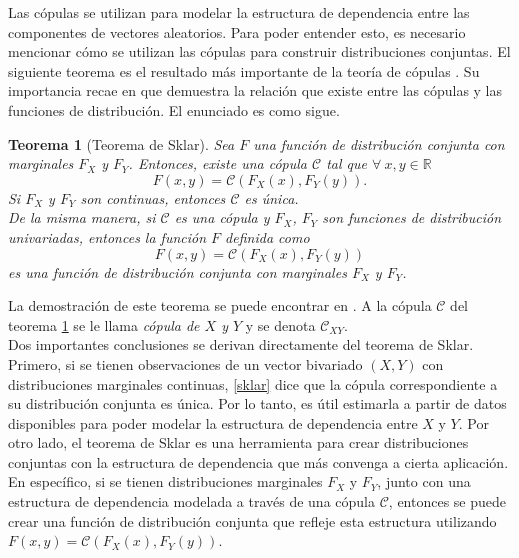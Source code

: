 \documentclass[11pt,a4paper]{article}
\newcommand{\R}{\mathbb{R}}
\newtheorem{theorem}{Teorema}[section]
\begin{document}
Las cópulas se utilizan para modelar la estructura de dependencia entre las componentes de vectores aleatorios. Para poder entender esto, es necesario mencionar cómo se utilizan las cópulas para construir distribuciones conjuntas. El siguiente teorema es el resultado más importante de la teoría de cópulas \citep{copula_modeling}. Su importancia recae en que demuestra la relación que existe entre las cópulas y las funciones de distribución. El enunciado es como sigue.\\

\begin{theorem}[Teorema de Sklar]
\label{sklar}
Sea $F$ una función de distribución conjunta con marginales $F_X$ y $F_Y$. Entonces, existe una cópula $\mathcal{C}$ tal que $\forall \ x,y \in \R$ $$F(x,y) = \mathcal{C}(F_X(x), F_Y(y)).$$ Si $F_X$ y $F_Y$ son continuas, entonces $\mathcal{C}$ es única.\\

De la misma manera, si $\mathcal{C}$ es una cópula y $F_X$, $F_Y$ son funciones de distribución univariadas, entonces la función $F$ definida como $$F(x, y) = \mathcal{C}(F_X(x), F_Y(y))$$ es una función de distribución conjunta con marginales $F_X$ y $F_Y$.\\
\end{theorem}

La demostración de este teorema se puede encontrar en \citet{nelsen}. A la cópula $\mathcal{C}$ del teorema \ref{sklar} se le llama \textit{cópula de $X$ y $Y$} y se denota $\mathcal{C}_{XY}$.\\

Dos importantes conclusiones se derivan directamente del teorema de Sklar. Primero, si se tienen observaciones de un vector bivariado $(X, Y)$ con distribuciones marginales continuas, \eqref{sklar} dice que la cópula correspondiente a su distribución conjunta es única. Por lo tanto, es útil estimarla a partir de datos disponibles para poder modelar la estructura de dependencia entre $X$ y $Y$. Por otro lado, el teorema de Sklar es una herramienta para crear distribuciones conjuntas con la estructura de dependencia que más convenga a cierta aplicación. En específico, si se tienen distribuciones marginales $F_X$ y $F_Y$, junto con una estructura de dependencia modelada a través de una cópula $\mathcal{C}$, entonces se puede crear una función de distribución conjunta que refleje esta estructura utilizando $F(x, y) = \mathcal{C} (F_X(x), F_Y(y))$.\\
\end{document}
